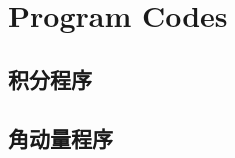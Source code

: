 \chapter{Program Codes} \label{chap:code}

\section{积分程序}
\begin{example}
    
\end{example}

\section{角动量程序}
\begin{example}[6j-program]
    
\end{example}
